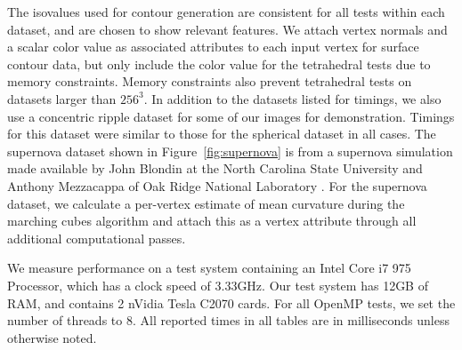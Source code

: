 \documentclass[10pt,journal,cspaper,compsoc]{IEEEtran}
\begin{document}
The isovalues used for contour generation are consistent for all tests within each dataset, and are chosen to show relevant features. We attach vertex normals and a scalar color value as associated attributes to each input vertex for surface contour data, but only include the color value for the tetrahedral tests due to memory constraints. Memory constraints also prevent tetrahedral tests on datasets larger than $256^3$. In addition to the datasets listed for timings, we also use a concentric ripple dataset for some of our images for demonstration. Timings for this dataset were similar to those for the spherical dataset in all cases. The supernova dataset shown in Figure~\ref{fig:supernova} is from a supernova simulation made available by John Blondin at the North Carolina State University and Anthony Mezzacappa of Oak Ridge National Laboratory \cite{Blondin2003}. For the supernova dataset, we calculate a per-vertex estimate of mean curvature \cite{Kindleman2003} during the marching cubes algorithm and attach this as a vertex attribute through all additional computational passes. 




We measure performance on a test system containing an Intel Core i7 975 Processor, which has a clock speed of 3.33GHz. Our test system has 12GB of RAM, and contains 2 nVidia Tesla C2070 cards. For all OpenMP tests, we set the number of threads to 8. All reported times in all tables are in milliseconds unless otherwise noted.


\end{document}
